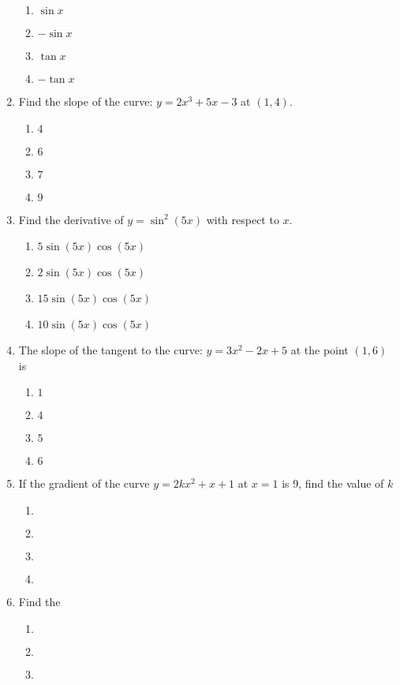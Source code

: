 \begin{multicols}{2}
\begin{enumerate}[label={\arabic*.}]
	\begin{enumerate}[label={\Alph*.}]
	\item \(\sin{x}\)
	\item \(-\sin{x}\)
	\item \(\tan{x}\)
	\item \(-\tan{x}\)
	\end{enumerate}
\item Find the slope of the curve: \(y = 2x^{3}+ 5{x}-3\) at \((1,4)\).
	\begin{enumerate}[label={\Alph*.}]
	\item \(4\)
	\item \(6\)
	\item \(7\)
	\item \(9\)
	\end{enumerate}
\item Find the derivative of \(y = \sin^{2}{(5x)}\) with respect to \(x\).
	\begin{enumerate}[label={\Alph*.}]
	\item \(5 \sin{(5x)\cos{(5x)}}\)
	\item \(2 \sin{(5x)\cos{(5x)}}\)
	\item \(15 \sin{(5x)\cos{(5x)}}\)
	\item \(10 \sin{(5x)\cos{(5x)}}\)
	\end{enumerate}
\item The slope of the tangent to the curve: \(y=3{x}^{2}-2x+5\) at the point \((1,6)\) is
	\begin{enumerate}[label={\Alph*.}]
	\item \(1\)
	\item \(4\)
	\item \(5\)
	\item \(6\)
	\end{enumerate}
\item If the gradient of the curve \(y=2k{x}^{2}+x+1\) at \(x = 1\) is 9, find the value of \(k\)
	\begin{enumerate}[label={\Alph*.}]
	\item \(\)
	\item \(\)
	\item \(\)
	\item \(\)
	\end{enumerate}
\item Find the 
	\begin{enumerate}[label={\Alph*.}]
	\item \(\)
	\item \(\)
	\item \(\)

\end{enumerate}
\end{enumerate}
\end{multicols}
